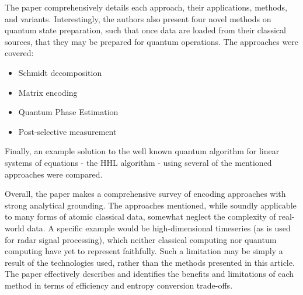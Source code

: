 The paper comprehensively details each approach, their applications, methods, and variants. Interestingly, the authors also present four novel methods on quantum state preparation, such that once data are loaded from their classical sources, that they may be prepared for quantum operations. The approaches were covered:

\begin{itemize}
    \item Schmidt decomposition
    \item Matrix encoding
    \item Quantum Phase Estimation
    \item Post-selective measurement
\end{itemize}

Finally, an example solution to the well known quantum algorithm for linear systems of equations - the HHL algorithm - using several of the mentioned approaches were compared.

Overall, the paper makes a comprehensive survey of encoding approaches with strong analytical grounding. The approaches mentioned, while soundly applicable to many forms of atomic classical data, somewhat neglect the complexity of real-world data. A specific example would be high-dimensional timeseries (as is used for radar signal processing), which neither classical computing nor quantum computing have yet to represent faithfully. Such a limitation may be simply a result of the technologies used, rather than the methods presented in this article. The paper effectively describes and identifies the benefits and limitations of each method in terms of efficiency and entropy conversion trade-offs.


